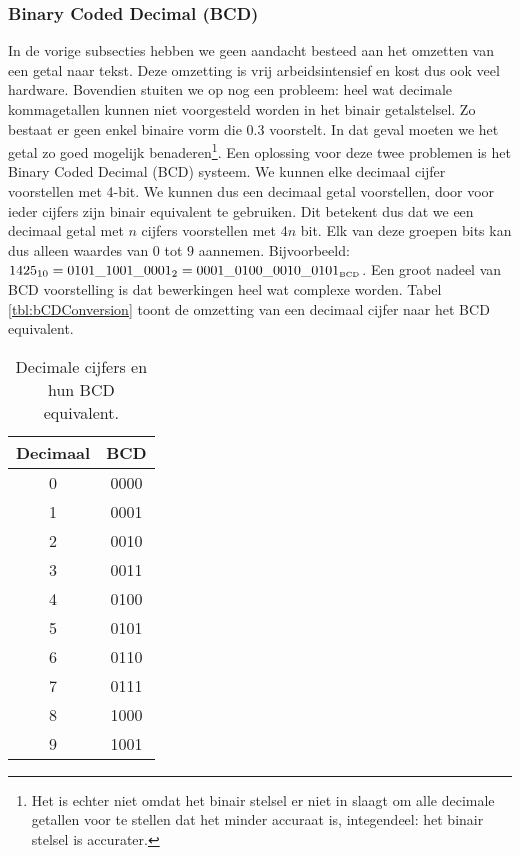 \subsubsection{Binary Coded Decimal (BCD)}
In de vorige subsecties hebben we geen aandacht besteed aan het omzetten van een getal naar tekst. Deze omzetting is vrij arbeidsintensief en kost dus ook veel hardware. Bovendien stuiten we op nog een probleem: heel wat decimale kommagetallen kunnen niet voorgesteld worden in het binair getalstelsel. Zo bestaat er geen enkel binaire vorm die $0.3$ voorstelt. In dat geval moeten we het getal zo goed mogelijk benaderen\footnote{Het is echter niet omdat het binair stelsel er niet in slaagt om alle decimale getallen voor te stellen dat het minder accuraat is, integendeel: het binair stelsel is accurater.}. Een oplossing voor deze twee problemen is het Binary Coded Decimal (BCD) systeem. We kunnen elke decimaal cijfer voorstellen met 4-bit. We kunnen dus een decimaal getal voorstellen, door voor ieder cijfers zijn binair equivalent te gebruiken. Dit betekent dus dat we een decimaal getal met $n$ cijfers voorstellen met $4n$ bit. Elk van deze groepen bits kan dus alleen waardes van $0$ tot $9$ aannemen. Bijvoorbeeld: $1425_{10}=0101\_1001\_0001_2=0001\_0100\_0010\_0101_{\mbox{\tiny{BCD}}}$. Een groot nadeel van BCD voorstelling is dat bewerkingen heel wat complexe worden. Tabel \ref{tbl:bCDConversion} toont de omzetting van een decimaal cijfer naar het BCD equivalent.
\begin{table}[hbt]
\centering
\begin{tabular}{c|c}
Decimaal&BCD\\\hline
0&0000\\
1&0001\\
2&0010\\
3&0011\\
4&0100\\
5&0101\\
6&0110\\
7&0111\\
8&1000\\
9&1001
\end{tabular}
\caption{Decimale cijfers en hun BCD equivalent.}
\end{table}
